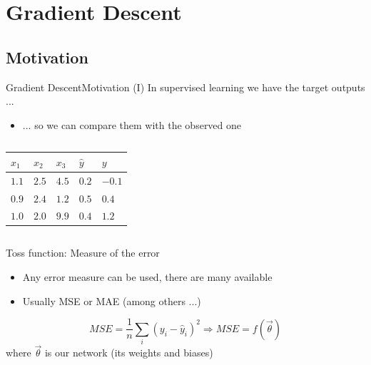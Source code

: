 \documentclass[10pt,compress]{beamer} %
\begin{document}
\section{Gradient Descent}
\subsection{Motivation}

\begin{frame}{Gradient Descent}{Motivation (I)}
    In supervised learning we have the target outputs ...
	\begin{itemize}
	\item ... so we can compare them with the observed one
	\end{itemize}

	\begin{columns}[c]
            

            \begin{table}[]
            \centering
            \begin{tabular}{lll|l|l}\hline
		    $x_1$ & $x_2$ & $x_3$ & $\hat{y}$ & $y$ \\
               \hline
              $1.1$ & $2.5$ & $4.5$ & $0.2$ & $-0.1$   \\
              $0.9$ & $2.4$ & $1.2$ & $0.5$ & $0.4$  \\
              $1.0$ & $2.0$ & $9.9$ & $0.4$ & $1.2$ \\\hline
            \end{tabular}
	    \end{table}
    \end{columns}

    \alert{Toss function}: Measure of the error
        \begin{itemize}
		\item Any error measure can be used, there are many available
		\item Usually MSE or MAE (among others ...)
        \end{itemize}

	\begin{equation*}
		MSE = \frac{1}{n} \sum_i(y_i-\hat{y}_i)^2 \Rightarrow MSE = f(\vec{\theta})
	\end{equation*}
	where $\vec{\theta}$ is our network (its weights and biases)
\end{frame}
\end{document}
